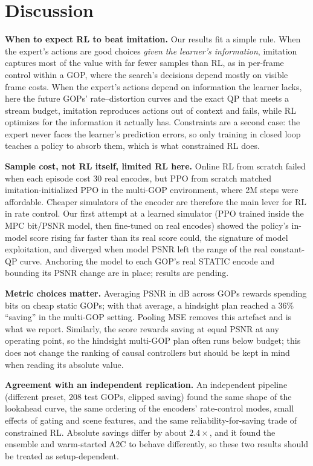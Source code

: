 \documentclass[conference]{IEEEtran}
\begin{document}
\section{Discussion}\label{sec:discussion}
\textbf{When to expect RL to beat imitation.} Our results fit a simple rule. When the expert's actions are good choices \emph{given the learner's information}, imitation captures most of the value with far fewer samples than RL, as in per-frame control within a GOP, where the search's decisions depend mostly on visible frame costs. When the expert's actions depend on information the learner lacks, here the future GOPs' rate--distortion curves and the exact QP that meets a stream budget, imitation reproduces actions out of context and fails, while RL optimizes for the information it actually has. Constraints are a second case: the expert never faces the learner's prediction errors, so only training in closed loop teaches a policy to absorb them, which is what constrained RL does.

\textbf{Sample cost, not RL itself, limited RL here.} Online RL from scratch failed when each episode cost 30 real encodes, but PPO from scratch matched imitation-initialized PPO in the multi-GOP environment, where 2M steps were affordable. Cheaper simulators of the encoder are therefore the main lever for RL in rate control. Our first attempt at a learned simulator (PPO trained inside the MPC bit/PSNR model, then fine-tuned on real encodes) showed the policy's in-model score rising far faster than its real score could, the signature of model exploitation, and diverged when model PSNR left the range of the real constant-QP curve. Anchoring the model to each GOP's real STATIC encode and bounding its PSNR change are in place; results are pending.

\textbf{Metric choices matter.} Averaging PSNR in dB across GOPs rewards spending bits on cheap static GOPs; with that average, a hindsight plan reached a 36\% ``saving'' in the multi-GOP setting. Pooling MSE removes this artefact and is what we report. Similarly, the score rewards saving at equal PSNR at any operating point, so the hindsight multi-GOP plan often runs below budget; this does not change the ranking of causal controllers but should be kept in mind when reading its absolute value.

\textbf{Agreement with an independent replication.} An independent pipeline (different preset, 208 test GOPs, clipped saving) found the same shape of the lookahead curve, the same ordering of the encoders' rate-control modes, small effects of gating and scene features, and the same reliability-for-saving trade of constrained RL. Absolute savings differ by about $2.4\times$, and it found the ensemble and warm-started A2C to behave differently, so these two results should be treated as setup-dependent.
\end{document}
